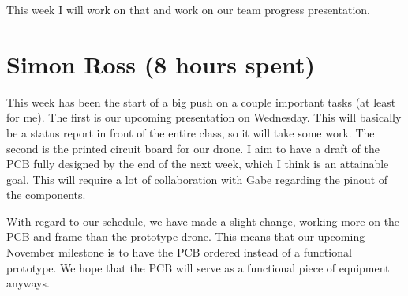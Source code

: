 \documentclass[12pt, titlepage]{article}
\begin{document}
This week I will work on that and work on our team progress presentation. 

\section*{Simon Ross (8 hours spent)}

This week has been the start of a big push on a couple important tasks (at least for me). The first is our upcoming presentation on Wednesday. This will basically be a status report in front of the entire class, so it will take some work. The second is the printed circuit board for our drone. I aim to have a draft of the PCB fully designed by the end of the next week, which I think is an attainable goal. This will require a lot of collaboration with Gabe regarding the pinout of the components. 

With regard to our schedule, we have made a slight change, working more on the PCB and frame than the prototype drone. This means that our upcoming November milestone is to have the PCB ordered instead of a functional prototype. We hope that the PCB will serve as a functional piece of equipment anyways.
\end{document}
